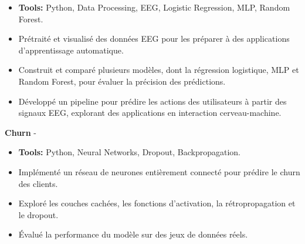 \documentclass[a4paper,11pt]{article}%
\begin{document}
\begin{itemize}[leftmargin=2em,parsep=0pt,topsep=1em]%
\item[] \textbf{Tools:} Python, Data Processing, EEG, Logistic Regression, MLP, Random Forest.%
\item Pr\'etrait\'e et visualis\'e des donn\'ees EEG pour les pr\'eparer \`a des applications d'apprentissage automatique.%
\item Construit et compar\'e plusieurs mod\`eles, dont la r\'egression logistique, MLP et Random Forest, pour \'evaluer la pr\'ecision des pr\'edictions.%
\item D\'evelopp\'e un pipeline pour pr\'edire les actions des utilisateurs \`a partir des signaux EEG, explorant des applications en interaction cerveau-machine.%
\end{itemize}%
%
\noindent \textbf{Churn} - \href{https://github.com/sboof911/churn}{{}}%
\begin{itemize}[leftmargin=2em,parsep=0pt,topsep=1em]%
\item[] \textbf{Tools:} Python, Neural Networks, Dropout, Backpropagation.%
\item Impl\'ement\'e un r\'eseau de neurones enti\`erement connect\'e pour pr\'edire le churn des clients.%
\item Explor\'e les couches cach\'ees, les fonctions d'activation, la r\'etropropagation et le dropout.%
\item \'Evalu\'e la performance du mod\`ele sur des jeux de donn\'ees r\'eels.%
\end{itemize}%
%
\end{document}

